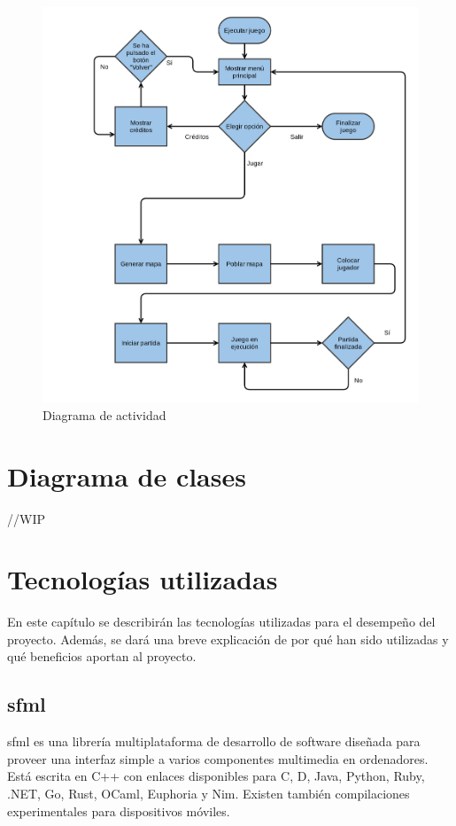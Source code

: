 	\begin{figure}[!htp]
		 \centering
		 \includegraphics[scale=.15]{fig/actividad}
		 \caption{Diagrama de actividad}
		 \label{fig:activi}
	\end{figure}

	\FloatBarrier

\section{Diagrama de clases}
	
	//WIP

\section{Tecnologías utilizadas}

	En este capítulo se describirán las tecnologías utilizadas para el desempeño del proyecto. Además, se dará una breve explicación de por qué han sido utilizadas y qué beneficios aportan al proyecto.

	\subsection{\acrshort{sfml}}

		\acrfull{sfml} es una librería multiplataforma de desarrollo de software diseñada para proveer una interfaz simple a varios componentes multimedia en ordenadores. Está escrita en C++ con enlaces disponibles para C, D, Java, Python, Ruby, .NET, Go, Rust, OCaml, Euphoria y Nim. Existen también compilaciones experimentales para dispositivos móviles.

